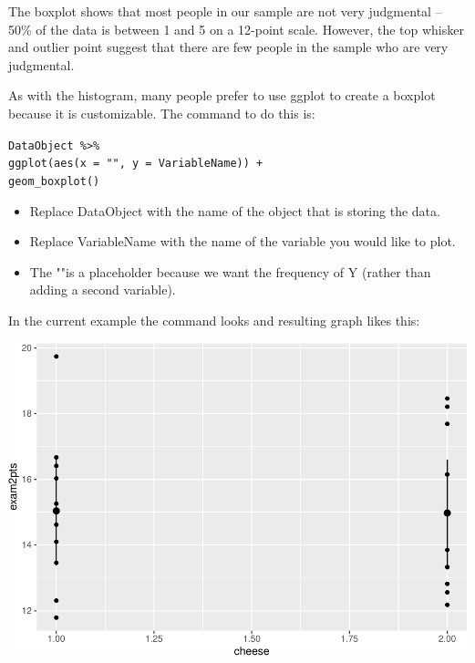 \documentclass[
]{book}
\newenvironment{Shaded}{\begin{snugshade}}{\end{snugshade}}
\newcommand{\DataTypeTok}[1]{\textcolor[rgb]{0.13,0.29,0.53}{#1}}
\newcommand{\KeywordTok}[1]{\textcolor[rgb]{0.13,0.29,0.53}{\textbf{#1}}}
\newcommand{\NormalTok}[1]{#1}
\newcommand{\OperatorTok}[1]{\textcolor[rgb]{0.81,0.36,0.00}{\textbf{#1}}}
\newcommand{\StringTok}[1]{\textcolor[rgb]{0.31,0.60,0.02}{#1}}
\providecommand{\tightlist}{%
  \setlength{\itemsep}{0pt}\setlength{\parskip}{0pt}}
\begin{document}
The boxplot shows that most people in our sample are not very judgmental -- 50\% of the data is between 1 and 5 on a 12-point scale. However, the top whisker and outlier point suggest that there are few people in the sample who are very judgmental.

As with the histogram, many people prefer to use ggplot to create a boxplot because it is customizable. The command to do this is:

\texttt{DataObject\ \%\textgreater{}\%}\\
\texttt{ggplot(aes(x\ =\ "",\ y\ =\ VariableName))\ +}~\\
\texttt{geom\_boxplot()}

\begin{itemize}
\tightlist
\item
  Replace DataObject with the name of the object that is storing the data.\\
\item
  Replace VariableName with the name of the variable you would like to plot.\\
\item
  The ""is a placeholder because we want the frequency of Y (rather than adding a second variable).
\end{itemize}

In the current example the command looks and resulting graph likes this:

\begin{Shaded}
\end{Shaded}

\includegraphics{Tools-for-working-with-data-211_files/figure-latex/unnamed-chunk-3-1.pdf}
\end{document}
